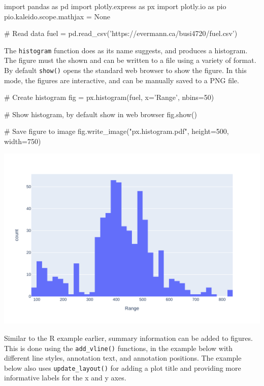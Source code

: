 \begin{samepage}
\begin{pythoncode}
import pandas as pd
import plotly.express as px
import plotly.io as pio
pio.kaleido.scope.mathjax = None

# Read data
fuel = pd.read_csv('https://evermann.ca/busi4720/fuel.csv')
\end{pythoncode}
\end{samepage}

\noindent The \texttt{histogram} function does as its name suggests, and produces a histogram. The figure must the shown and can be written to a file using a variety of format. By default \texttt{show()} opens the standard web browser to show the figure. In this mode, the figures are interactive, and can be manually saved to a PNG file.

\begin{samepage}
\begin{pythoncode}
# Create histogram
fig = px.histogram(fuel, x='Range', nbins=50)

# Show histogram, by default show in web browser
fig.show()

# Save figure to image
fig.write_image("px.histogram.pdf", height=500, width=750)
\end{pythoncode}
\end{samepage}

\begin{center}
    \includegraphics[width=.8\textwidth]{px.histogram.pdf}
\end{center}

Similar to the R example earlier, summary information can be added to figures. This is done using the \texttt{add\_vline()} functions, in the example below with different line styles, annotation text, and annotation positions. The example below also uses \texttt{update\_layout()} for adding a plot title and providing more informative labels for the x and y axes.

